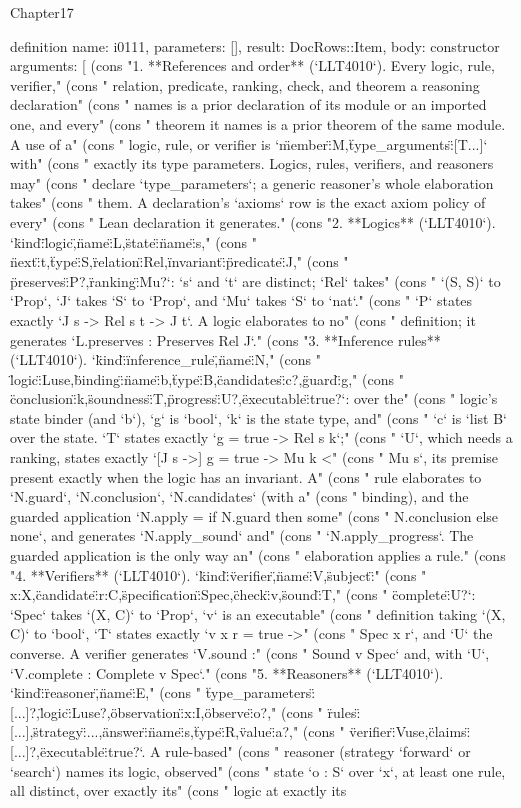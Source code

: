 \begin{lexlean}{Chapter17}
\begin{semanticmodule}
definition{
  name: i0111,
  parameters: [],
  result: DocRows::Item,
  body: constructor{
    arguments: [
      (cons "1. **References and order** (`LLT4010`). Every logic, rule, verifier," (cons "   relation, predicate, ranking, check, and theorem a reasoning declaration" (cons "   names is a prior declaration of its module or an imported one, and every" (cons "   theorem it names is a prior theorem of the same module. A use of a" (cons "   logic, rule, or verifier is `{\"member\":M,\"type_arguments\":[T...]}` with" (cons "   exactly its type parameters. Logics, rules, verifiers, and reasoners may" (cons "   declare `type_parameters`; a generic reasoner's whole elaboration takes" (cons "   them. A declaration's `axioms` row is the exact axiom policy of every" (cons "   Lean declaration it generates." (cons "2. **Logics** (`LLT4010`). `{\"kind\":\"logic\",\"name\":L,\"state\":{\"name\":s," (cons "   \"next\":t,\"type\":S},\"relation\":Rel,\"invariant\":{\"predicate\":J," (cons "   \"preserves\":P}?,\"ranking\":Mu?}`: `s` and `t` are distinct; `Rel` takes" (cons "   `(S, S)` to `Prop`, `J` takes `S` to `Prop`, and `Mu` takes `S` to `nat`." (cons "   `P` states exactly `J s -> Rel s t -> J t`. A logic elaborates to no" (cons "   definition; it generates `L.preserves : Preserves Rel J`." (cons "3. **Inference rules** (`LLT4010`). `{\"kind\":\"inference_rule\",\"name\":N," (cons "   \"logic\":Luse,\"binding\":{\"name\":b,\"type\":B,\"candidates\":c}?,\"guard\":g," (cons "   \"conclusion\":k,\"soundness\":T,\"progress\":U?,\"executable\":true?}`: over the" (cons "   logic's state binder (and `b`), `g` is `bool`, `k` is the state type, and" (cons "   `c` is `list B` over the state. `T` states exactly `g = true -> Rel s k`;" (cons "   `U`, which needs a ranking, states exactly `[J s ->] g = true -> Mu k <" (cons "   Mu s`, its premise present exactly when the logic has an invariant. A" (cons "   rule elaborates to `N.guard`, `N.conclusion`, `N.candidates` (with a" (cons "   binding), and the guarded application `N.apply = if N.guard then some" (cons "   N.conclusion else none`, and generates `N.apply_sound` and" (cons "   `N.apply_progress`. The guarded application is the only way an" (cons "   elaboration applies a rule." (cons "4. **Verifiers** (`LLT4010`). `{\"kind\":\"verifier\",\"name\":V,\"subject\":" (cons "   {x:X},\"candidate\":{r:C},\"specification\":Spec,\"check\":v,\"sound\":T," (cons "   \"complete\":U?}`: `Spec` takes `(X, C)` to `Prop`, `v` is an executable" (cons "   definition taking `(X, C)` to `bool`, `T` states exactly `v x r = true ->" (cons "   Spec x r`, and `U` the converse. A verifier generates `V.sound :" (cons "   Sound v Spec` and, with `U`, `V.complete : Complete v Spec`." (cons "5. **Reasoners** (`LLT4010`). `{\"kind\":\"reasoner\",\"name\":E," (cons "   \"type_parameters\":[...]?,\"logic\":Luse?,\"observation\":{x:I},\"observe\":o?," (cons "   \"rules\":[...],\"strategy\":...,\"answer\":{\"name\":s,\"type\":R,\"value\":a}?," (cons "   \"verifier\":Vuse,\"claims\":[...]?,\"executable\":true?}`. A rule-based" (cons "   reasoner (strategy `forward` or `search`) names its logic, observed" (cons "   state `o : S` over `x`, at least one rule, all distinct, over exactly its" (cons "   logic at exactly its }}
\end{semanticmodule}
\end{lexlean}
